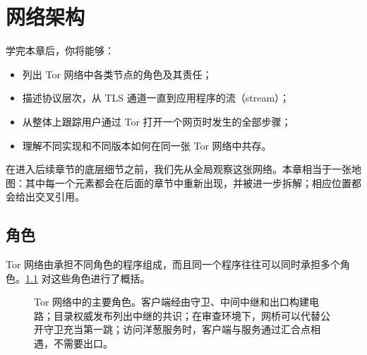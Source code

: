 \chapter{网络架构}\label{cap:06-architettura}

\begin{obiettivi}
学完本章后，你将能够：
\begin{itemize}[nosep]
  \item 列出 Tor 网络中各类节点的角色及其责任；
  \item 描述协议层次，从 TLS 通道一直到应用程序的流（stream）；
  \item 从整体上跟踪用户通过 Tor 打开一个网页时发生的全部步骤；
  \item 理解不同实现和不同版本如何在同一张 Tor 网络中共存。
\end{itemize}
\end{obiettivi}

在进入后续章节的底层细节之前，我们先从全局观察这张网络。本章相当于一张地图：其中每一个元素都会在后面的章节中重新出现，并被进一步拆解；相应位置都会给出交叉引用。

\section{角色}\label{sec:arch-ruoli}

Tor 网络由承担不同角色的程序组成，而且同一个程序往往可以同时承担多个角色。\cref{fig:arch-ruoli} 对这些角色进行了概括。

\begin{figure}[htbp]
\centering

\caption{Tor 网络中的主要角色。客户端经由守卫、中间中继和出口构建电路；目录权威发布列出中继的共识；在审查环境下，网桥可以代替公开守卫充当第一跳；访问洋葱服务时，客户端与服务通过汇合点相遇，不需要出口。}
\label{fig:arch-ruoli}
\end{figure}

